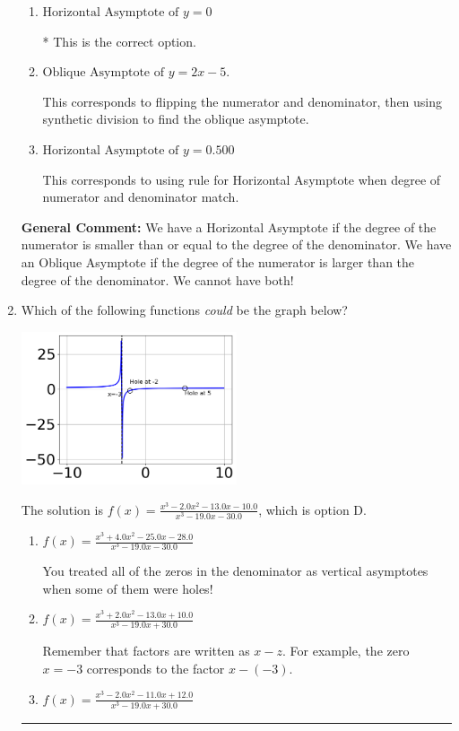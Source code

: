 \documentclass{extbook}[14pt]
\newcommand{\litem}[1]{\item #1

\rule{\textwidth}{0.4pt}}
\begin{document}
\begin{enumerate}
{\begin{enumerate}[label=\Alph*.]
This corresponds to considering where the denominator is equal to 0 as horizontal asymptote.
\item \( \text{Horizontal Asymptote of } y = 0 \)

* This is the correct option.
\item \( \text{Oblique Asymptote of } y = 2x -5. \)

This corresponds to flipping the numerator and denominator, then using synthetic division to find the oblique asymptote.
\item \( \text{Horizontal Asymptote of } y = 0.500  \)

This corresponds to using rule for Horizontal Asymptote when degree of numerator and denominator match.
\end{enumerate}

\textbf{General Comment:} We have a Horizontal Asymptote if the degree of the numerator is smaller than or equal to the degree of the denominator. We have an Oblique Asymptote if the degree of the numerator is larger than the degree of the denominator. We cannot have both!
}
\litem{
Which of the following functions \textit{could} be the graph below?

\begin{center}
    \includegraphics[width=0.5\textwidth]{../Figures/identifyGraphOfRationalFunctionA.png}
\end{center}


The solution is \( f(x)=\frac{x^{3} -2.0 x^{2} -13.0 x -10.0}{x^{3} -19.0 x -30.0} \), which is option D.\begin{enumerate}[label=\Alph*.]
\item \( f(x)=\frac{x^{3} +4.0 x^{2} -25.0 x -28.0}{x^{3} -19.0 x -30.0} \)

You treated all of the zeros in the denominator as vertical asymptotes when some of them were holes!
\item \( f(x)=\frac{x^{3} +2.0 x^{2} -13.0 x + 10.0}{x^{3} -19.0 x + 30.0} \)

Remember that factors are written as $x-z$. For example, the zero $x=-3$ corresponds to the factor $x-(-3)$.
\item \( f(x)=\frac{x^{3} -2.0 x^{2} -11.0 x + 12.0}{x^{3} -19.0 x + 30.0} \)


\end{enumerate}}
\end{enumerate}
\end{document}
